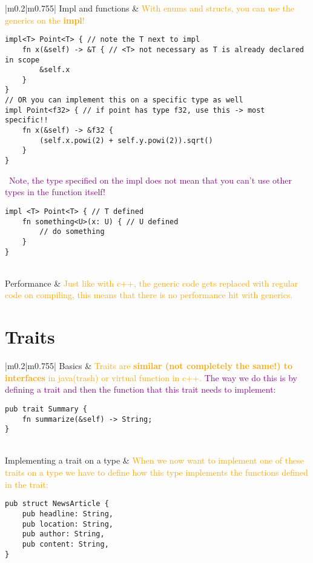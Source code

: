 \documentclass[main.tex,fontsize=8pt,paper=a4,paper=portrait,DIV=calc,]{scrartcl}
\begin{document}
\pagebreak
\begin{table}[ht!]
\begin{tabular}{|m{0.2\linewidth}|m{0.755\linewidth}|}
\hline
Impl and functions & 
\textcolor{orange}{With enums and structs, you can use the generics on the \textbf{impl}!}\newline
\begin{lstlisting}
impl<T> Point<T> { // note the T next to impl
    fn x(&self) -> &T { // <T> not necessary as T is already declared in scope
        &self.x
    }
}
// OR you can implement this on a specific type as well
impl Point<f32> { // if point has type f32, use this -> most specific!!
    fn x(&self) -> &f32 {
        (self.x.powi(2) + self.y.powi(2)).sqrt()
    }
}
\end{lstlisting}
\, \newline
\textcolor{purple}{Note, the type specified on the impl does not mean that you can't use other types in the function itself!}\newline
\begin{lstlisting}
impl <T> Point<T> { // T defined
    fn something<U>(x: U) { // U defined
        // do something
    }
}
\end{lstlisting}\\
\hline
Performance & 
\textcolor{orange}{Just like with c++, the generic code gets replaced with regular code on compiling, this means that there is no performance hit with generics.}\\
\hline
\end{tabular}
\section{Traits}
\begin{tabular}{|m{0.2\linewidth}|m{0.755\linewidth}|}
\hline
Basics & 
\textcolor{orange}{Traits are \textbf{similar (not completely the same!) to interfaces} in java(trash) or virtual function in c++.}\newline
\textcolor{purple}{The way we do this is by defining a trait and then the function that this trait needs to implement:}\newline
\begin{lstlisting}
pub trait Summary {
    fn summarize(&self) -> String;
}
\end{lstlisting}\\
\hline
Implementing a trait on a type & 
\textcolor{orange}{When we now want to implement one of these traits on a type we have to define how this type implements the functions defined in the trait:}\newline
\begin{lstlisting}
pub struct NewsArticle {
    pub headline: String,
    pub location: String,
    pub author: String,
    pub content: String,
}


\end{lstlisting}
\end{tabular}
\end{table}
\end{document}
